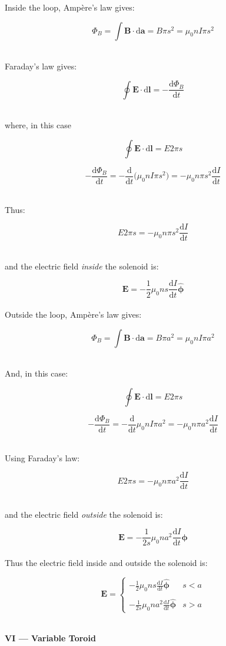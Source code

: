 \documentclass[9pt]{extarticle}
\renewcommand{\v}[1]{{\bm #1}}
\newcommand{\hv}[1]{\hat{\bm{#1}}}
\renewcommand{\d}{\text{d}}
\newcommand{\ddt}[1]{\frac{\d #1}{\d t}}
\newcommand{\muo}{\mu_0}
\begin{document}
\begin{multicols*}{2}
Inside the loop, Ampère's law gives: 

$$\Phi_B = \int \v B \cdot \d \v a = B\pi s^2  = \muo n I \pi s^2$$ \ 

Faraday's law gives:

$$\oint \v E \cdot \d \v l = -\ddt{\Phi_B}$$ \ 

where, in this case 

$$\oint \v E \cdot \d \v l = E2\pi s$$

$$-\ddt{\Phi_B} = -\ddt{} \big( \muo nI\pi s^2 \big) = -\muo n\pi s^2 \ddt I$$ \ 

Thus:

$$E2\pi s = -\muo n\pi s^2 \ddt I$$ \ 

and the electric field {\it inside} the solenoid is:

$$ \v E = -\frac 12 \muo ns \ddt I \hv \phi$$ \\ 

Outside the loop, Ampère's law gives:

$$\Phi_B = \int \v B \cdot \d \v a = B\pi a^2 = \muo nI \pi a^2$$ \ 

And, in this case:

$$\oint \v E \cdot \d \v l = E2\pi s$$

$$-\ddt{\Phi_B} = -\ddt{} \muo nI \pi a^2 = -\muo n\pi a^2 \ddt I$$ \ 

Using Faraday's law:

$$E2\pi s = -\muo n\pi a^2 \ddt I$$ \ 

and the electric field {\it outside} the solenoid is:

$$\v E = -\frac{1}{2s} \muo na^2 \ddt I \v \phi$$ \\ 

Thus the electric field inside and outside the solenoid is:

$$
\v E = 
\begin{cases}
	 -\frac 12 \muo ns \ddt I \hv \phi & s < a \\
	\\  
	 -\frac{1}{2s} \muo na^2 \ddt I \hv \phi & s > a
\end{cases}
$$ \ 









\hrulefill 

\hfill 

{\LARGE \bf VI --- Variable Toroid} \\ 


\end{multicols*}
\end{document}
